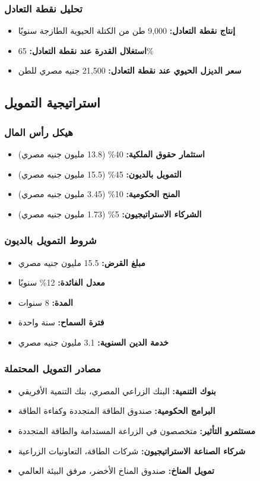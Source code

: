 \subsubsection{تحليل نقطة التعادل}
\begin{itemize}
    \item \textbf{إنتاج نقطة التعادل:} 9,000 طن من الكتلة الحيوية الطازجة سنويًا
    \item \textbf{استغلال القدرة عند نقطة التعادل:} 65\%
    \item \textbf{سعر الديزل الحيوي عند نقطة التعادل:} 21,500 جنيه مصري للطن
\end{itemize}

\subsection{استراتيجية التمويل}

\subsubsection{هيكل رأس المال}
\begin{itemize}
    \item \textbf{استثمار حقوق الملكية:} 40\% (13.8 مليون جنيه مصري)
    \item \textbf{التمويل بالديون:} 45\% (15.5 مليون جنيه مصري)
    \item \textbf{المنح الحكومية:} 10\% (3.45 مليون جنيه مصري)
    \item \textbf{الشركاء الاستراتيجيون:} 5\% (1.73 مليون جنيه مصري)
\end{itemize}

\subsubsection{شروط التمويل بالديون}
\begin{itemize}
    \item \textbf{مبلغ القرض:} 15.5 مليون جنيه مصري
    \item \textbf{معدل الفائدة:} 12\% سنويًا
    \item \textbf{المدة:} 8 سنوات
    \item \textbf{فترة السماح:} سنة واحدة
    \item \textbf{خدمة الدين السنوية:} 3.1 مليون جنيه مصري
\end{itemize}

\subsubsection{مصادر التمويل المحتملة}
\begin{itemize}
    \item \textbf{بنوك التنمية:} البنك الزراعي المصري، بنك التنمية الأفريقي
    \item \textbf{البرامج الحكومية:} صندوق الطاقة المتجددة وكفاءة الطاقة
    \item \textbf{مستثمرو التأثير:} متخصصون في الزراعة المستدامة والطاقة المتجددة
    \item \textbf{شركاء الصناعة الاستراتيجيون:} شركات الطاقة، التعاونيات الزراعية
    \item \textbf{تمويل المناخ:} صندوق المناخ الأخضر، مرفق البيئة العالمي
\end{itemize}

